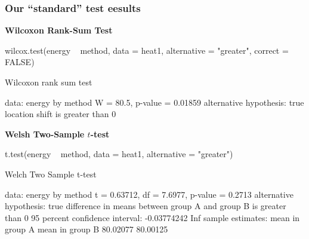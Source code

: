 \documentclass[a4paper]{article}
\begin{document}
\subsubsection{Our ``standard'' test eesults}
\textbf{Wilcoxon Rank-Sum Test}
\begin{Schunk}
\begin{Sinput}
wilcox.test(energy ~ method, data = heat1, alternative = "greater", correct = FALSE)
\end{Sinput}
\begin{Soutput}

	Wilcoxon rank sum test

data:  energy by method
W = 80.5, p-value = 0.01859
alternative hypothesis: true location shift is greater than 0
\end{Soutput}
\end{Schunk}
\textbf{Welsh Two-Sample \( t \)-test}
\begin{Schunk}
\begin{Sinput}
t.test(energy ~ method, data = heat1, alternative = "greater")
\end{Sinput}
\begin{Soutput}

	Welch Two Sample t-test

data:  energy by method
t = 0.63712, df = 7.6977, p-value = 0.2713
alternative hypothesis: true difference in means between group A and group B is greater than 0
95 percent confidence interval:
 -0.03774242         Inf
sample estimates:
mean in group A mean in group B 
       80.02077        80.00125 
\end{Soutput}
\end{Schunk}
\end{document}
